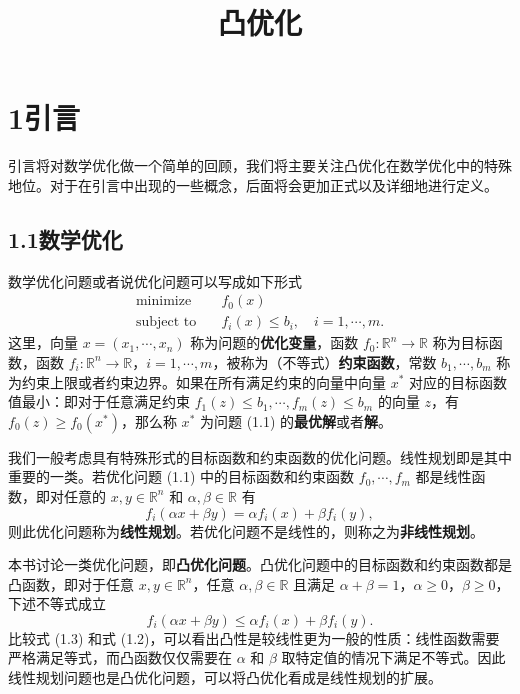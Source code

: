 \documentclass[UTF8,12pt,a4paper,fontset=fandol]{ctexart}
\title{凸优化}
\author{}
\date{}
\begin{document}
\maketitle

\section*{1\quad 引言}

引言将对数学优化做一个简单的回顾，我们将主要关注凸优化在数学优化中的特殊地位。对于在引言中出现的一些概念，后面将会更加正式以及详细地进行定义。

\subsection*{1.1\quad 数学优化}

数学优化问题或者说优化问题可以写成如下形式
\begin{equation}
\begin{aligned}
  \text{minimize}\quad & f_0(x)\\
  \text{subject to}\quad & f_i(x)\le b_i,\quad i=1,\cdots,m.
\end{aligned}
\tag{1.1}
\end{equation}
这里，向量 $x=(x_1,\cdots,x_n)$ 称为问题的\textbf{优化变量}，函数 $f_0:\mathbb{R}^n\to\mathbb{R}$ 称为目标函数，函数 $f_i:\mathbb{R}^n\to\mathbb{R}$，$i=1,\cdots,m$，被称为（不等式）\textbf{约束函数}，常数 $b_1,\cdots,b_m$ 称为约束上限或者约束边界。如果在所有满足约束的向量中向量 $x^*$ 对应的目标函数值最小：即对于任意满足约束 $f_1(z)\le b_1,\cdots,f_m(z)\le b_m$ 的向量 $z$，有 $f_0(z)\ge f_0(x^*)$，那么称 $x^*$ 为问题 (1.1) 的\textbf{最优解}或者\textbf{解}。

我们一般考虑具有特殊形式的目标函数和约束函数的优化问题。线性规划即是其中重要的一类。若优化问题 (1.1) 中的目标函数和约束函数 $f_0,\cdots,f_m$ 都是线性函数，即对任意的 $x,y\in\mathbb{R}^n$ 和 $\alpha,\beta\in\mathbb{R}$ 有
\begin{equation}
  f_i(\alpha x+\beta y)=\alpha f_i(x)+\beta f_i(y),
\tag{1.2}
\end{equation}
则此优化问题称为\textbf{线性规划}。若优化问题不是线性的，则称之为\textbf{非线性规划}。

本书讨论一类优化问题，即\textbf{凸优化问题}。凸优化问题中的目标函数和约束函数都是凸函数，即对于任意 $x,y\in\mathbb{R}^n$，任意 $\alpha,\beta\in\mathbb{R}$ 且满足 $\alpha+\beta=1$，$\alpha\ge0$，$\beta\ge0$，下述不等式成立
\begin{equation}
  f_i(\alpha x+\beta y)\le \alpha f_i(x)+\beta f_i(y).
\tag{1.3}
\end{equation}
比较式 (1.3) 和式 (1.2)，可以看出凸性是较线性更为一般的性质：线性函数需要严格满足等式，而凸函数仅仅需要在 $\alpha$ 和 $\beta$ 取特定值的情况下满足不等式。因此线性规划问题也是凸优化问题，可以将凸优化看成是线性规划的扩展。
\end{document}
